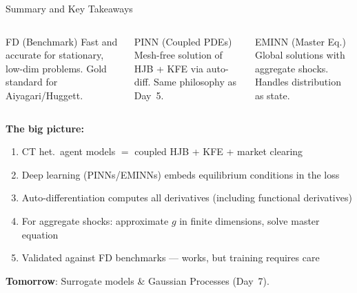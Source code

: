 \documentclass[aspectratio=169,11pt]{beamer}
\newcommand{\emphc}[1]{\textcolor{harvardcrimson}{#1}}
\begin{document}
\begin{frame}{Summary and Key Takeaways}
\begin{columns}[T]
\begin{block}{FD (Benchmark)}
\centering\small
\vspace{0.1em}
Fast and accurate for \emphc{stationary, low-dim} problems. Gold standard for Aiyagari/Huggett.
\vspace{0.1em}
\end{block}

\begin{block}{PINN (Coupled PDEs)}
\centering\small
\vspace{0.1em}
\emphc{Mesh-free} solution of HJB + KFE via auto-diff. Same philosophy as Day~5.
\vspace{0.1em}
\end{block}

\begin{block}{EMINN (Master Eq.)}
\centering\small
\vspace{0.1em}
\emphc{Global solutions} with aggregate shocks. Handles distribution as state.
\vspace{0.1em}
\end{block}
\end{columns}

\vspace{0.2em}
\small
\textbf{The big picture:}
\begin{enumerate}\itemsep0pt
    \item CT het.\ agent models $=$ coupled HJB + KFE + market clearing
    \item Deep learning (PINNs/EMINNs) embeds equilibrium conditions in the loss
    \item Auto-differentiation computes all derivatives (including functional derivatives)
    \item For aggregate shocks: approximate $g$ in finite dimensions, solve master equation
    \item Validated against FD benchmarks --- works, but training requires care
\end{enumerate}

\vspace{0.1em}
\begin{center}
\textbf{Tomorrow}: Surrogate models \& Gaussian Processes (Day~7).
\end{center}
\end{frame}
\end{document}
